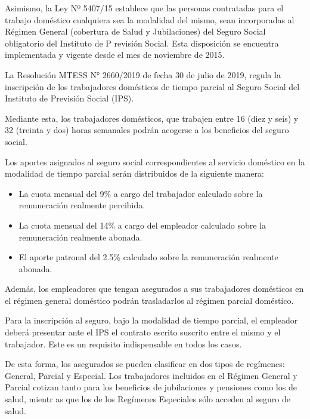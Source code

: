 Asimismo, la Ley Nº 5407/15 establece que las personas contratadas para
el trabajo doméstico cualquiera sea la modalidad del mismo, sean
incorporadas al Régimen General (cobertura de Salud y Jubilaciones) del
Seguro Social obligatorio del Instituto de P revisión Social. Esta
disposición se encuentra implementada y vigente desde el mes de
noviembre de 2015.

La Resolución MTESS N° 2660/2019 de fecha 30 de julio de 2019, regula la
inscripción de los trabajadores domésticos de tiempo parcial al Seguro
Social del Instituto de Previsión Social (IPS)\cite{METSS. (2019)}.

Mediante esta, los trabajadores domésticos, que trabajen entre 16 (diez
y seis) y 32 (treinta y dos) horas semanales podrán acogerse a los
beneficios del seguro social.

Los aportes asignados al seguro social correspondientes al servicio
doméstico en la modalidad de tiempo parcial serán distribuidos de la
siguiente manera:

\begin {itemize}

\item La cuota mensual del 9\% a cargo del trabajador calculado sobre la remuneración realmente percibida.

\item La cuota mensual del 14\% a cargo del empleador calculado sobre la remuneración realmente abonada.

\item El aporte patronal del 2.5\% calculado sobre la remuneración realmente abonada.

\end{itemize}

Además, los empleadores que tengan asegurados a sus trabajadores
domésticos en el régimen general doméstico podrán trasladarlos al
régimen parcial doméstico.

Para la inscripción al seguro, bajo la modalidad de tiempo parcial, el
empleador deberá presentar ante el IPS el contrato escrito suscrito
entre el mismo y el trabajador. Este es un requisito indispensable en
todos los casos.

De esta forma, los asegurados se pueden clasificar en dos tipos de
regímenes: General, Parcial y Especial. Los trabajadores incluidos en el
Régimen General y Parcial cotizan tanto para los beneficios de
jubilaciones y pensiones como los de salud, mientr as que los de los
Regímenes Especiales sólo acceden al seguro de salud.

